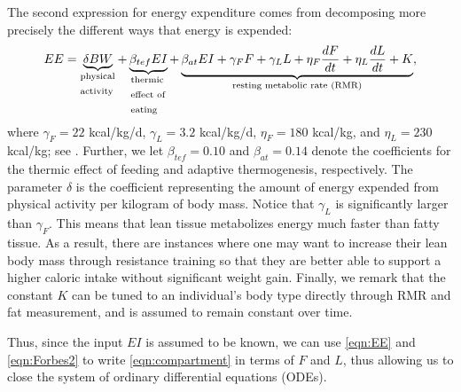The second expression for energy expenditure comes from decomposing more precisely the different ways that energy is expended:
\begin{equation}
\label{eqn:EE}
EE = \underbrace{\delta BW}_\text{\parbox{1cm}{physical\\activity}} + \underbrace{\beta_{tef} EI}_\text{\parbox{1cm}{thermic\\effect of\\eating}} + \underbrace{\beta_{at} EI + \gamma_F F + \gamma_L L + \eta_F \dfrac{dF}{dt} + \eta_L \dfrac{dL}{dt}  + K}_\text{resting metabolic rate (RMR)},
\end{equation}
where $\gamma_F = 22$ kcal/kg/d, $\gamma_L = 3.2$ kcal/kg/d, $\eta_F = 180$ kcal/kg, and $\eta_L = 230$ kcal/kg; see \cite{Hall.2, Hall.4}.
Further, we let $\beta_{tef}=0.10$ and $\beta_{at}=0.14$ denote the coefficients for the thermic effect of feeding and adaptive thermogenesis, respectively.
The parameter $\delta$ is the coefficient representing the amount of energy expended from physical activity per kilogram of body mass.
Notice that $\gamma_L$ is significantly larger than $\gamma_F$.
This means that lean tissue metabolizes energy much faster than fatty tissue.
As a result, there are instances where one may want to increase their lean body mass through resistance training so that they are better able to support a higher caloric intake without significant weight gain.
Finally, we remark that the constant $K$ can be tuned to an individual's body type directly through RMR and fat measurement, and is assumed to remain constant over time.


Thus, since the input $EI$ is assumed to be known, we can use \eqref{eqn:EE} and \eqref{eqn:Forbes2} to write \eqref{eqn:compartment} in terms of $F$ and $L$, thus allowing us to close the system of ordinary differential equations (ODEs).

